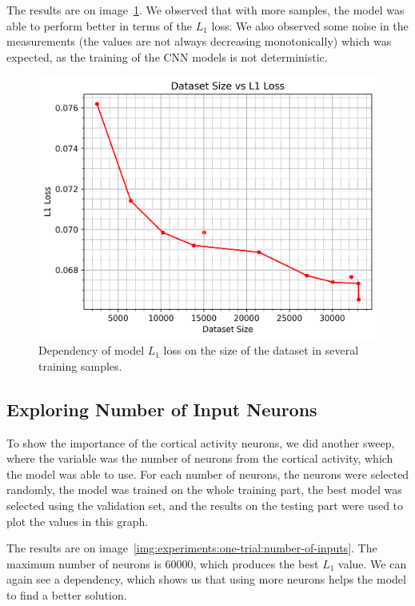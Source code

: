 The results are on image~\ref{img:experiments:one-trial:number-of-samples}. We observed that with more samples, the model was able to perform better in terms of the $L_1$ loss. We also observed some noise in the measurements (the values are not always decreasing monotonically) which was expected, as the training of the CNN models is not deterministic.

\begin{figure}[H]\centering
\includegraphics[width=140mm]{img/one-trial/dataset_size_one_trial.png}
\caption{Dependency of model $L_1$ loss on the size of the dataset in several training samples.}
\label{img:experiments:one-trial:number-of-samples}
\end{figure}


\subsection{Exploring Number of Input Neurons}
\label{experiments:one-trial:number-of-inputs}
To show the importance of the cortical activity neurons, we did another sweep, where the variable was the number of neurons from the cortical activity, which the model was able to use. For each number of neurons, the neurons were selected randomly, the model was trained on the whole training part, the best model was selected using the validation set, and the results on the testing part were used to plot the values in this graph.

The results are on image~\ref{img:experiments:one-trial:number-of-inputs}. The maximum number of neurons is $60000$, which produces the best $L_1$ value. We can again see a dependency, which shows us that using more neurons helps the model to find a better solution.

